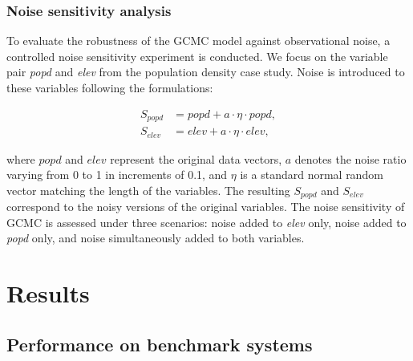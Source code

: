 \documentclass[authoryear,preprint,review,12pt]{elsarticle}
\begin{document}
\subsubsection{Noise sensitivity analysis}

To evaluate the robustness of the GCMC model against observational noise, a controlled noise sensitivity experiment is conducted. We focus on the variable pair \textit{popd} and \textit{elev} from the population density case study. Noise is introduced to these variables following the formulations:

\begin{equation}\label{eq-sensitivity}
\begin{aligned}
S_{popd} &= popd + a \cdot \eta \cdot popd, \\
S_{elev} &= elev + a \cdot \eta \cdot elev,
\end{aligned}
\end{equation}

where \(popd\) and \(elev\) represent the original data vectors, \(a\) denotes the noise ratio varying from 0 to 1 in increments of 0.1, and \(\eta\) is a standard normal random vector matching the length of the variables. The resulting \(S_{popd}\) and \(S_{elev}\) correspond to the noisy versions of the original variables. The noise sensitivity of GCMC is assessed under three scenarios: noise added to \textit{elev} only, noise added to \textit{popd} only, and noise simultaneously added to both variables.

\section{Results}\label{sec3} 

\subsection{Performance on benchmark systems}\label{benchmark}
\end{document}
